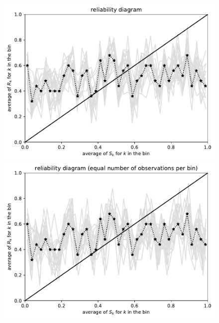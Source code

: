 \documentclass{article}
\begin{document}
\begin{figure}
\begin{centering}
\vspace{\vertsep}

\parbox{\imsize}{\includegraphics[width=\imsize]
                {./codes/unweighted/1000_40_0_0/equiprob.pdf}}
\quad\quad
\parbox{\imsize}{\includegraphics[width=\imsize]
                {./codes/unweighted/1000_40_0_0/equisamp.pdf}}

\vspace{\vertsep}


\end{centering}
\end{figure}
\end{document}
